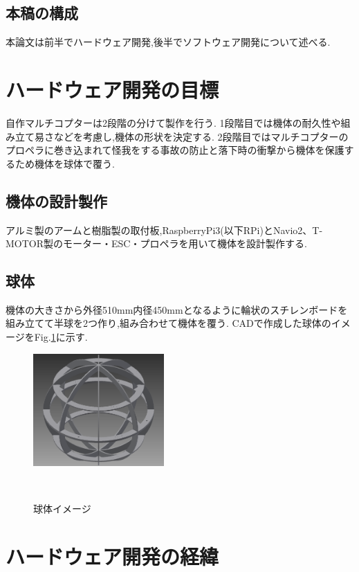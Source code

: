 \documentclass[a4paper]{jarticle}
\begin{document}
\subsection{本稿の構成}
本論文は前半でハードウェア開発,後半でソフトウェア開発について述べる.


\section{ハードウェア開発の目標}
自作マルチコプターは2段階の分けて製作を行う.
1段階目では機体の耐久性や組み立て易さなどを考慮し,機体の形状を決定する.
2段階目ではマルチコプターのプロペラに巻き込まれて怪我をする事故の防止と落下時の衝撃から機体を保護するため機体を球体で覆う.

\subsection{機体の設計製作}
アルミ製のアームと樹脂製の取付板,RaspberryPi3(以下RPi)とNavio2、T-MOTOR製のモーター・ESC・プロペラを用いて機体を設計製作する.

\subsection{球体}
機体の大きさから外径510mm内径450mmとなるように輪状のスチレンボードを組み立てて半球を2つ作り,組み合わせて機体を覆う.
CADで作成した球体のイメージをFig.\ref{fig:sphere-CAD}に示す.

\begin{figure}[htbp]
 \begin{center}
  \includegraphics[width=50mm]{image/sphere-CAD.png}
 　\caption{球体イメージ}
 　\label{fig:sphere-CAD}
 \end{center}
\end{figure}

\section{ハードウェア開発の経緯}
\end{document}
